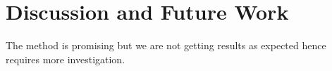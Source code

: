 \section{Discussion and Future Work}
\label{sec:discussions}
The method is promising but we are not getting results as expected hence
requires more investigation.
